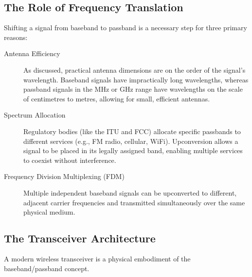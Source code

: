\subsection{The Role of Frequency Translation}

Shifting a signal from baseband to passband is a necessary step for three primary reasons:
\begin{description}
    \item[Antenna Efficiency] As discussed, practical antenna dimensions are on the order of the signal's wavelength. Baseband signals have impractically long wavelengths, whereas passband signals in the MHz or GHz range have wavelengths on the scale of centimetres to metres, allowing for small, efficient antennas.
    \item[Spectrum Allocation] Regulatory bodies (like the ITU and FCC) allocate specific passbands to different services (e.g., FM radio, cellular, WiFi). Upconversion allows a signal to be placed in its legally assigned band, enabling multiple services to coexist without interference.
    \item[Frequency Division Multiplexing (FDM)] Multiple independent baseband signals can be upconverted to different, adjacent carrier frequencies and transmitted simultaneously over the same physical medium.
\end{description}


\subsection{The Transceiver Architecture}

A modern wireless transceiver is a physical embodiment of the baseband/passband concept.

